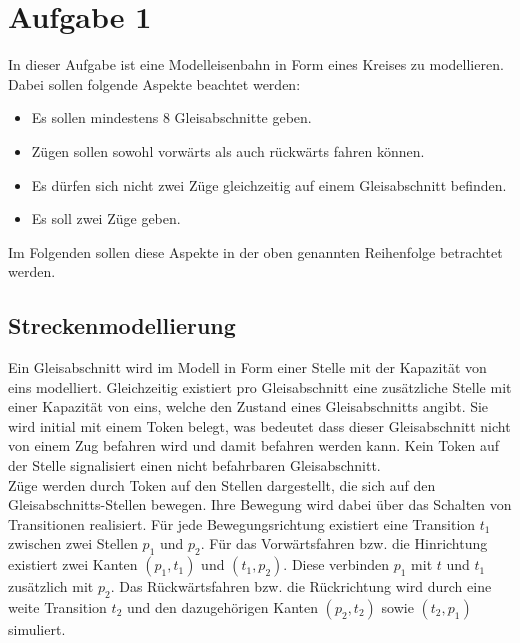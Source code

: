 \documentclass[10pt]{scrartcl}
\author{Carsten Noetzel, Armin Steudte}
\title{\titletext}
\date{18.04.2012}
\begin{document}
\maketitle

\setcounter{tocdepth}{3}
\tableofcontents
\listoffigures

\section{Aufgabe 1}
In dieser Aufgabe ist eine Modelleisenbahn in Form eines Kreises zu modellieren.
Dabei sollen folgende Aspekte beachtet werden:
\begin{itemize}
	\item Es sollen mindestens 8 Gleisabschnitte geben.
	\item Zügen sollen sowohl vorwärts als auch rückwärts fahren können.
	\item Es dürfen sich nicht zwei Züge gleichzeitig auf einem Gleisabschnitt befinden.
	\item Es soll zwei Züge geben.
\end{itemize}
Im Folgenden sollen diese Aspekte in der oben genannten Reihenfolge betrachtet werden.

\subsection{Streckenmodellierung}
Ein Gleisabschnitt wird im Modell in Form einer Stelle mit der Kapazität von eins modelliert.
Gleichzeitig existiert pro Gleisabschnitt eine zusätzliche Stelle mit einer Kapazität von eins, welche den Zustand eines Gleisabschnitts angibt.
Sie wird initial mit einem Token belegt, was bedeutet dass dieser Gleisabschnitt nicht von einem Zug befahren wird und damit befahren werden kann.
Kein Token auf der Stelle signalisiert einen nicht befahrbaren Gleisabschnitt.\\
Züge werden durch Token auf den Stellen dargestellt, die sich auf den Gleisabschnitts-Stellen bewegen.
Ihre Bewegung wird dabei über das Schalten von Transitionen realisiert.
Für jede Bewegungsrichtung existiert eine Transition $t_{1}$ zwischen zwei Stellen $p_{1}$ und $p_{2}$.
Für das Vorwärtsfahren bzw. die Hinrichtung existiert zwei Kanten $(p_{1},t_{1})$ und $(t_{1},p_{2})$. Diese verbinden $p_{1}$ mit $t$ und $t_{1}$ zusätzlich mit $p_{2}$.
Das Rückwärtsfahren bzw. die Rückrichtung wird durch eine weite Transition $t_{2}$ und den dazugehörigen Kanten $(p_{2},t_{2})$ sowie $(t_{2},p_{1})$ simuliert.
\end{document}
